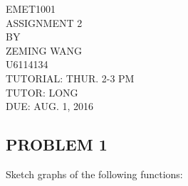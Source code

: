 \documentclass{article}
\begin{document}





\begin{center}
\huge
\vspace*{1.0in} EMET1001 
\\\vspace{0.5in} ASSIGNMENT 2
\normalsize
\\\vspace{0.5in} BY
\\\vspace{0.1in} ZEMING WANG
\\\vspace{0.1in} U6114134
\normalsize
\\\vspace{0.5in} TUTORIAL: THUR. 2-3 PM
\\\vspace{0.1in} TUTOR: LONG
\normalsize
\\\vspace{0.5in} DUE: AUG. 1, 2016
\end{center}
\newpage

\subsection*{PROBLEM 1}

Sketch graphs of the following functions:
\end{document}
